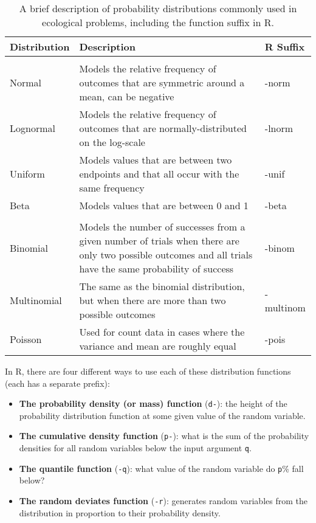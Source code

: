 \documentclass[]{book}
\theoremstyle{definition}
\theoremstyle{definition}
\theoremstyle{definition}
\theoremstyle{remark}
\begin{document}
\begin{table}

\caption{\label{tab:dist-table-pdf}A brief description of probability distributions commonly used in ecological problems, including the function suffix in R.}
\centering
\begin{tabular}[t]{l>{\raggedright\arraybackslash}p{20em}>{\ttfamily}l}
\toprule
\textbf{Distribution} & \textbf{Description} & \textbf{R Suffix}\\
\midrule
\addlinespace[0.3em]
\multicolumn{3}{l}{\textbf{Continuous}}\\
\hline
\hspace{1em}Normal & Models the relative frequency of outcomes that are symmetric around a mean, can be negative & -norm\\
\hspace{1em}Lognormal & Models the relative frequency of outcomes that are normally-distributed on the log-scale & -lnorm\\
\hspace{1em}Uniform & Models values that are between two endpoints and that all occur with the same frequency & -unif\\
\hspace{1em}Beta & Models values that are between 0 and 1 & -beta\\
\addlinespace[0.3em]
\multicolumn{3}{l}{\textbf{Discrete}}\\
\hline
\hspace{1em}Binomial & Models the number of successes from a given number of trials when there are only two possible outcomes and all trials have the same probability of success & -binom\\
\hspace{1em}Multinomial & The same as the binomial distribution, but when there are more than two possible outcomes & -multinom\\
\hspace{1em}Poisson & Used for count data in cases where the variance and mean are roughly equal & -pois\\
\bottomrule
\end{tabular}
\end{table}

In R, there are four different ways to use each of these distribution
functions (each has a separate prefix):

\begin{itemize}
\item
  \textbf{The probability density (or mass) function} (\texttt{d-}): the
  height of the probability distribution function at some given value of
  the random variable.
\item
  \textbf{The cumulative density function} (\texttt{p-}): what is the
  sum of the probability densities for all random variables below the
  input argument \texttt{q}.
\item
  \textbf{The quantile function} (\texttt{-q}): what value of the random
  variable do \texttt{p}\% fall below?
\item
  \textbf{The random deviates function} (\texttt{-r}): generates random
  variables from the distribution in proportion to their probability
  density.
\end{itemize}
\end{document}
